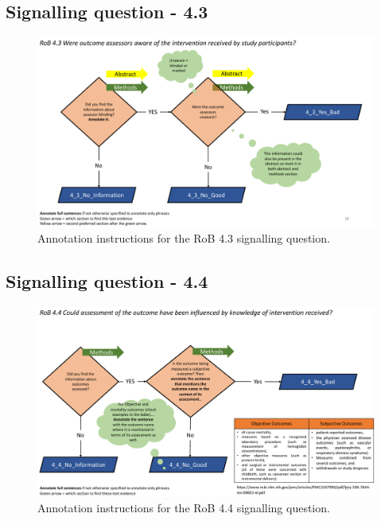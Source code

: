 \documentclass[sn-mathphys,Numbered]{sn-jnl}%
\begin{document}
\subsection*{Signalling question - 4.3 }
%
\begin{figure}[hbt]
    \centering
    \includegraphics[width=\textwidth]{figures/4_3.pdf}
    \caption{Annotation instructions for the RoB 4.3 signalling question.}
    \label{fig:4_3}
\end{figure}
%
%
%
\subsection*{Signalling question - 4.4 }
%
\begin{figure}[hbt]
    \centering
    \includegraphics[width=\textwidth]{figures/4_4.pdf}
    \caption{Annotation instructions for the RoB 4.4 signalling question.}
    \label{fig:4_4}
\end{figure}
%
%
%
\end{document}
